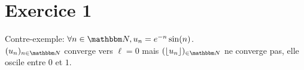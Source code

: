 \part{Exercice 1}
Contre-exemple: $\forall n \in \N, u_n = e^{-n}\sin(n)$.\\
$(u_n)_{n\in\N}$ converge vers $\ell = 0$ mais $(\left\lfloor u_n \right\rfloor)_{\in\N}$ ne converge pas, elle oscile entre  $0$ et $1$.

